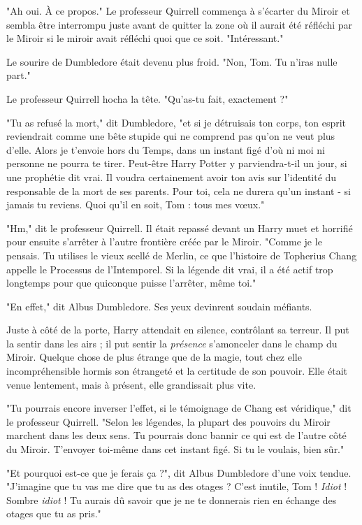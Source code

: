 "Ah oui. À ce propos." Le professeur Quirrell commença à s'écarter du Miroir et sembla être interrompu juste avant de quitter la zone où il aurait été réfléchi par le Miroir si le miroir avait réfléchi quoi que ce soit. "Intéressant."

Le sourire de Dumbledore était devenu plus froid. "Non, Tom. Tu n'iras nulle part."

Le professeur Quirrell hocha la tête. "Qu'as-tu fait, exactement ?"

"Tu as refusé la mort," dit Dumbledore, "et si je détruisais ton corps, ton esprit reviendrait comme une bête stupide qui ne comprend pas qu'on ne veut plus d'elle. Alors je t'envoie hors du Temps, dans un instant figé d'où ni moi ni personne ne pourra te tirer. Peut-être Harry Potter y parviendra-t-il un jour, si une prophétie dit vrai. Il voudra certainement avoir ton avis sur l'identité du responsable de la mort de ses parents. Pour toi, cela ne durera qu'un instant - si jamais tu reviens. Quoi qu'il en soit, Tom : tous mes vœux."

"Hm," dit le professeur Quirrell. Il était repassé devant un Harry muet et horrifié pour ensuite s'arrêter à l'autre frontière créée par le Miroir. "Comme je le pensais. Tu utilises le vieux scellé de Merlin, ce que l'histoire de Topherius Chang appelle le Processus de l'Intemporel. Si la légende dit vrai, il a été actif trop longtemps pour que quiconque puisse l'arrêter, même toi."

"En effet," dit Albus Dumbledore. Ses yeux devinrent soudain méfiants.

Juste à côté de la porte, Harry attendait en silence, contrôlant sa terreur. Il put la sentir dans les airs ; il put sentir la \emph{présence}  s'amonceler dans le champ du Miroir. Quelque chose de plus étrange que de la magie, tout chez elle incompréhensible hormis son étrangeté et la certitude de son pouvoir. Elle était venue lentement, mais à présent, elle grandissait plus vite.

"Tu pourrais encore inverser l'effet, si le témoignage de Chang est véridique," dit le professeur Quirrell. "Selon les légendes, la plupart des pouvoirs du Miroir marchent dans les deux sens. Tu pourrais donc bannir ce qui est de l'autre côté du Miroir. T'envoyer toi-même dans cet instant figé. Si tu le voulais, bien sûr."

"Et pourquoi est-ce que je ferais ça ?", dit Albus Dumbledore d'une voix tendue. "J'imagine que tu vas me dire que tu as des otages ? C'est inutile, Tom ! \emph{Idiot}  ! Sombre \emph{idiot}  ! Tu aurais dû savoir que je ne te donnerais rien en échange des otages que tu as pris."

